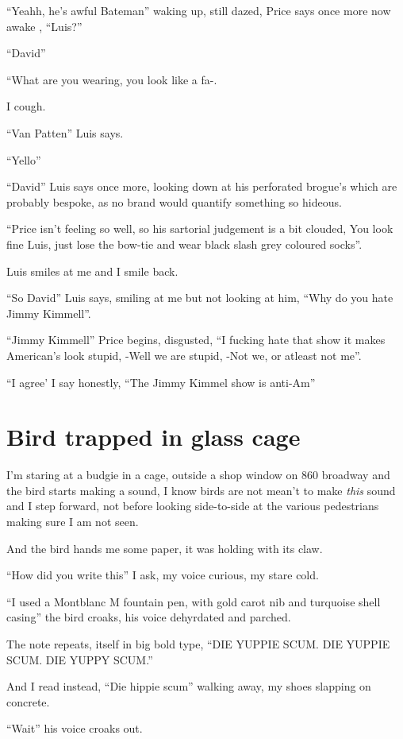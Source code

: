 \documentclass[19pt,openany]{book}
\begin{document}
``Yeahh, he's awful Bateman'' waking up,
still dazed, Price says once
more now awake
, ``Luis?''

``David''

``What are you wearing, you look like a fa-.

I cough.

``Van Patten'' Luis says.

``Yello''

``David'' Luis says
once more, looking
down at his perforated brogue's which
are probably bespoke, as no brand would
quantify something so hideous.

``Price isn't feeling so well, so his
sartorial judgement is a bit clouded,
You look fine Luis, just lose the bow-tie
and wear black slash grey coloured socks''.

Luis smiles at me and I smile back.

``So David'' Luis says, smiling at me but not looking at him,
``Why do you hate Jimmy Kimmell''.

``Jimmy Kimmell'' Price begins, disgusted,
``I fucking hate that show it makes American's
look stupid, -Well we are stupid, -Not we, or atleast not me''.

``I agree' I say honestly, ``The Jimmy Kimmel show is anti-Am''

\chapter{Bird trapped in glass cage}

I'm staring at a budgie in a cage,
outside a shop window on 860 broadway and
the bird starts making a sound, I know
birds are not mean't to make \textit{this}
sound and I step forward, not before looking side-to-side
at the various pedestrians making sure I am not seen.

And the bird hands me some paper, it was holding
with its claw.

``How did you write this'' I ask, my voice curious,
my stare cold.

``I used a Montblanc M fountain pen, with gold
carot nib and turquoise shell casing'' the bird
croaks, his voice dehyrdated and parched.

The note repeats, itself in big bold type,
``DIE YUPPIE SCUM. DIE YUPPIE SCUM. DIE
YUPPY SCUM.''

And I read instead, ``Die hippie scum'' walking
away, my shoes slapping on concrete.

``Wait'' his voice croaks out.
\end{document}
